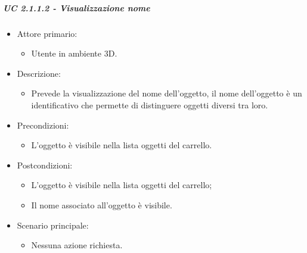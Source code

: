 \subparagraph{UC 2.1.1.2 - Visualizzazione nome}
\begin{itemize}
	
	\item Attore primario: 
	\begin{itemize}
		\item Utente in ambiente 3D.
	\end{itemize}
	\item Descrizione:
	\begin{itemize}
		\item Prevede la visualizzazione del nome dell'oggetto, il nome dell'oggetto è un identificativo che permette di distinguere oggetti diversi tra loro.
	\end{itemize}
	
	\item Precondizioni:
	\begin{itemize}
		\item L'oggetto è visibile nella lista oggetti del carrello.
	\end{itemize}
	
	\item Postcondizioni:
	\begin{itemize}
		\item L'oggetto è visibile nella lista oggetti del carrello;
		\item Il nome associato all'oggetto è visibile.
	\end{itemize}
	
	\item Scenario principale:
	\begin{itemize}
		\item Nessuna azione richiesta.
	\end{itemize}
	
\end{itemize}

